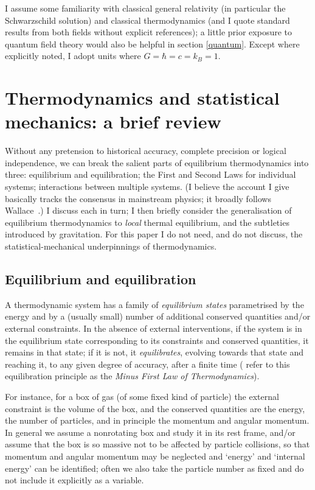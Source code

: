 \documentclass[12pt]{article}
\begin{document}
I assume some familiarity with classical general relativity (in particular the Schwarzschild solution) and classical thermodynamics (and I quote standard results from both fields without explicit references); a little prior exposure to quantum field theory would also be helpful in section \ref{quantum}. Except where explicitly noted, I adopt units where $G=\hbar=c=k_B=1$.

\section{Thermodynamics and statistical mechanics: a brief review}\label{review}

Without any pretension to historical accuracy, complete precision or logical independence, we can break the salient parts of equilibrium thermodynamics into three: equilibrium and equilibration; the First and Second Laws for individual systems; interactions between multiple systems. (I believe the account I give basically tracks the consensus in mainstream physics; it broadly follows Wallace~\citeyear{wallacethermocontrol,wallaceactualstatmech}.) I discuss each in turn; I then briefly consider the generalisation of equilibrium thermodynamics to \emph{local} thermal equilibrium, and the subtleties introduced by gravitation. For this paper I do not need, and do not discuss, the statistical-mechanical underpinnings of thermodynamics.




\subsection{Equilibrium and equilibration}

 A thermodynamic system has a family of \emph{equilibrium states} parametrised by the energy and by a (usually small) number of additional conserved quantities and/or external constraints. In the absence of external interventions, if the system is in the equilibrium state corresponding to its constraints and conserved quantities, it remains in that state; if it is not, it \emph{equilibrates}, evolving towards that state and reaching it, to any given degree of accuracy, after a finite time ( refer to this equilibration principle as the \emph{Minus First Law of Thermodynamics}).
 

 
 For instance, for a box of gas (of some fixed kind of particle) the external constraint is the volume of the box, and the conserved quantities are the energy, the number of particles, and in principle the momentum and angular momentum. In general we assume a nonrotating box and study it in its rest frame, and/or assume that the box is so massive not to be affected by particle collisions, so that momentum and angular momentum may be neglected and `energy' and `internal energy' can be identified; often we also take the particle number as fixed and do not include it explicitly as a variable.
\end{document}
